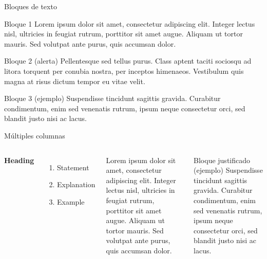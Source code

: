 \begin{frame}{Bloques de texto}
	\begin{block}{Bloque 1}
		Lorem ipsum dolor sit amet, consectetur adipiscing elit. Integer lectus nisl, ultricies in feugiat rutrum, porttitor sit amet augue. Aliquam ut tortor mauris. Sed volutpat ante purus, quis accumsan dolor.
	\end{block}
	
	\begin{alertblock}{Bloque 2 (alerta)}
		Pellentesque sed tellus purus. Class aptent taciti sociosqu ad litora torquent per conubia nostra, per inceptos himenaeos. Vestibulum quis magna at risus dictum tempor eu vitae velit.
	\end{alertblock}
	
	\begin{exampleblock}{Bloque 3 (ejemplo)}
		Suspendisse tincidunt sagittis gravida. Curabitur condimentum, enim sed venenatis rutrum, ipsum neque consectetur orci, sed blandit justo nisi ac lacus.
	\end{exampleblock}
\end{frame}


\begin{frame}{Múltiples columnas}
	\begin{columns}[c]
		\textbf{Heading}
		\begin{enumerate}
			\item Statement
			\item Explanation
			\item Example
		\end{enumerate}
		
		Lorem ipsum dolor sit amet, consectetur adipiscing elit. Integer lectus nisl, ultricies in feugiat rutrum, porttitor sit amet augue. Aliquam ut tortor mauris. Sed volutpat ante purus, quis accumsan dolor.

		\begin{exampleblockjustified}{Bloque justificado (ejemplo)}
			Suspendisse tincidunt sagittis gravida. Curabitur condimentum, enim sed venenatis rutrum, ipsum neque consectetur orci, sed blandit justo nisi ac lacus.
		\end{exampleblockjustified}
	\end{columns}
\end{frame}

